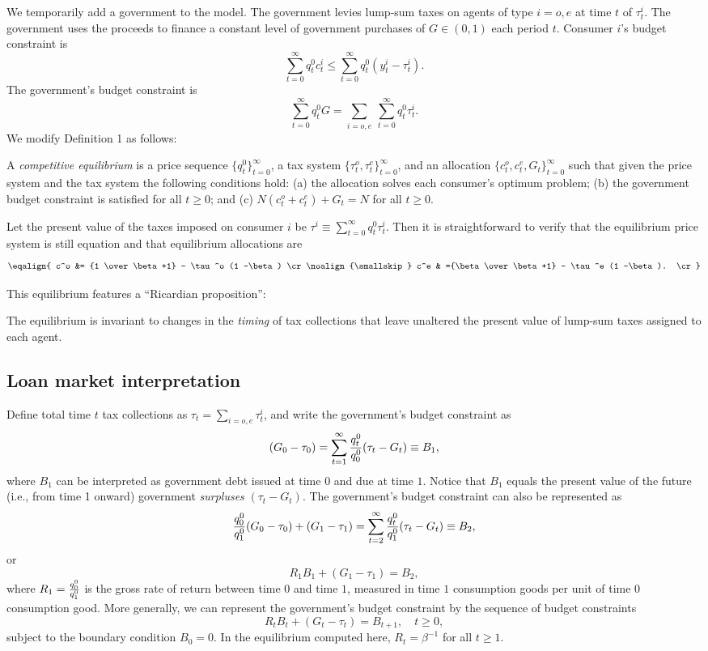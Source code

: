    We temporarily add a government to the model.  The
government levies lump-sum taxes on agents of type $i=o,e$ at
time $t$ of $\tau_t^i$.  The government uses the
proceeds to finance a constant level of government
purchases of $G \in (0,1)$ each period $t$. Consumer
$i$'s budget constraint is
$$ \sum_{t=0}^\infty q_t^0 c_t^i \leq \sum_{t=0}^\infty q_t^0
       (y_t^i - \tau_t^i).$$
The government's budget constraint is
$$ \sum_{t=0}^\infty q_t^0 G = \sum_{i=o,e}\ \sum_{t=0}^\infty
        q_t^0 \tau_t^i.$$
We modify Definition 1 as follows:

\medskip
{}  A {\it competitive equilibrium} is
a price sequence $\{q_t^0\}_{t=0}^\infty$,
a tax system $\{\tau_t^o, \tau_t^e\}_{t=0}^\infty$,
and an allocation $\{c_t^o, c_t^e, G_t\}_{t=0}^\infty$
such that given the price system and the tax system the following conditions
hold: (a) the allocation solves each consumer's optimum problem;
(b) the government budget constraint is satisfied for all $t\geq 0$; and
(c) $N(c^o_t+c^e_t)+G_t=N$ for all $t \geq 0$.

\medskip
Let the present value of the taxes imposed on consumer $i$
be $\tau^i \equiv \sum_{t=0}^\infty q_t^0 \tau_t^i$.  Then
it is straightforward to verify that the equilibrium price
system is still equation  and that equilibrium allocations
are
$$\eqalign{ c^o &= {1 \over \beta +1} - \tau^o (1 -\beta) \cr
\noalign{\smallskip}
            c^e & ={\beta \over \beta+1} - \tau^e (1 -\beta). \cr}$$

This equilibrium features a ``Ricardian proposition'':


 The equilibrium is invariant to changes in the {\it timing}
of tax collections that leave unaltered the present value of lump-sum
taxes assigned to each agent.

\subsection{Loan market interpretation}
Define total time $t$ tax collections
as $\tau_t = \sum_{i=o,e} \tau_t^i$,
and write the government's budget constraint as
$$  (G_0 - \tau_0) = \sum_{t=1}^\infty {q_t^0 \over q_0^0}
    (\tau_t - G_t) \equiv
     B_1,$$
where $B_1$ can be interpreted as government debt issued at
time $0$ and due at time $1$.  Notice that $B_1$ equals
the present value of the future (i.e., from time 1 onward) government
{\it surpluses} $(\tau_t - G_t)$. The government's budget constraint
can also be represented as
$$ {q_0^0 \over q_1^0}  (G_0 -\tau_0)  +(G_1 - \tau_1)
    = \sum_{t=2}^\infty {q_t^0 \over q_1^0}(\tau_t - G_t) \equiv B_2,$$
or
$$ R_1 B_1 +(G_1 - \tau_1) = B_2,$$
where $R_1 = {q_0^0 \over q_1^0}$ is the gross rate of
return between time $0$ and time $1$, measured in time $1$ consumption
goods
per unit of time $0$ consumption good.  More generally,
we can represent the government's budget constraint by
the sequence of budget constraints
$$ R_t B_t + (G_t - \tau_t) = B_{t+1} ,\quad t \geq 0,$$
subject to the boundary condition $B_0=0$.
In the equilibrium computed here,
$R_t = \beta^{-1}$ for all $t \geq 1$.


